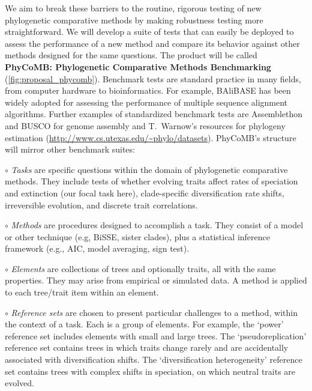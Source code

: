 We aim to break these barriers to the routine, rigorous testing of new phylogenetic comparative methods by making robustness testing more straightforward.
We will develop a suite of tests that can easily be deployed to assess the performance of a new method and compare its behavior against other methods designed for the same questions.
The product will be called \textbf{PhyCoMB: Phylogenetic Comparative Methods Benchmarking} (\cref{fig:proposal_phycomb}).
%
Benchmark tests are standard practice in many fields, from computer hardware to bioinformatics.
For example, BAliBASE \citep[the Benchmark Alignment dataBASE;][]{thompson1999, thompson2005} has been widely adopted for assessing the performance of multiple sequence alignment algorithms. %
Further examples of standardized benchmark tests are Assemblethon and BUSCO for genome assembly \citep{bradnam2013, simao2015} and T.~Warnow's resources for phylogeny estimation (\url{http://www.cs.utexas.edu/~phylo/datasets}).
%
PhyCoMB's structure will mirror other benchmark suites:

$\circ$ \textit{Tasks} are specific questions within the domain of phylogenetic comparative methods.
They include tests of whether evolving traits affect rates of speciation and extinction (our focal task here), clade-specific diversification rate shifts, irreversible evolution, and discrete trait correlations.

$\circ$ \textit{Methods} are procedures designed to accomplish a task.
They consist of a model or other technique (e.g, BiSSE, sister clades), plus a statistical inference framework (e.g., AIC, model averaging, sign test).

$\circ$ \textit{Elements} are collections of trees and optionally traits, all with the same properties. 
They may arise from empirical or simulated data.
A method is applied to each tree/trait item within an element.

$\circ$ \textit{Reference sets} are chosen to present particular challenges to a method, within the context of a task.
Each is a group of elements.
For example, the `power' reference set includes elements with small and large trees.
The `pseudoreplication' reference set contains trees in which traits change rarely and are accidentally associated with diversification shifts. 
The `diversification heterogeneity' reference set contains trees with complex shifts in speciation, on which neutral traits are evolved.

